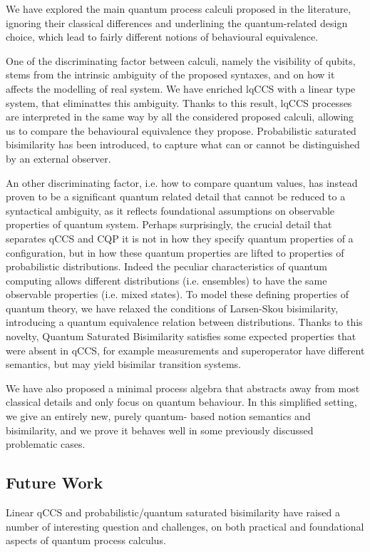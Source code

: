 We have explored the main  quantum process calculi proposed in the literature, ignoring their classical differences and underlining the quantum-related design choice, which lead to fairly different notions of behavioural equivalence.

One of the discriminating factor between calculi, namely the visibility of qubits, stems from the intrinsic ambiguity of the proposed syntaxes, and on how it affects the modelling of real system. We have enriched lqCCS with a linear type system, that eliminattes this ambiguity. Thanks to this result, lqCCS processes are interpreted in the same way by all the considered proposed calculi, allowing us to compare the behavioural equivalence they propose. Probabilistic saturated bisimilarity has been introduced, to capture what can or cannot be distinguished by an external observer.

An other discriminating factor, i.e. how to compare quantum values, has instead proven to be a significant quantum related detail that cannot be reduced to a syntactical ambiguity, as it reflects foundational assumptions on observable properties of quantum system. Perhaps surprisingly, the crucial detail that separates qCCS and CQP it is not in how they specify quantum properties of a configuration, but in how these quantum properties are lifted to properties of probabilistic distributions. Indeed the peculiar characteristics of quantum computing allows different distributions (i.e. ensembles) to have the same observable properties (i.e. mixed states). To model these defining properties of quantum theory, we have relaxed the conditions of Larsen-Skou bisimilarity, introducing a quantum equivalence relation between distributions. Thanks to this novelty, Quantum Saturated Bisimilarity satisfies some expected properties that were absent in qCCS, for example measurements and superoperator have different semantics, but may yield bisimilar transition systems. 

We have also proposed a minimal process algebra that abstracts away from most classical details and only focus on quantum behaviour. In this simplified setting, we give an entirely new, purely quantum- based notion semantics and bisimilarity, and we prove it behaves well in some previously discussed problematic cases. 

\subsection*{Future Work}
Linear qCCS and probabilistic/quantum saturated bisimilarity have raised a number of interesting question and challenges, on both practical and foundational aspects of quantum process calculus.

